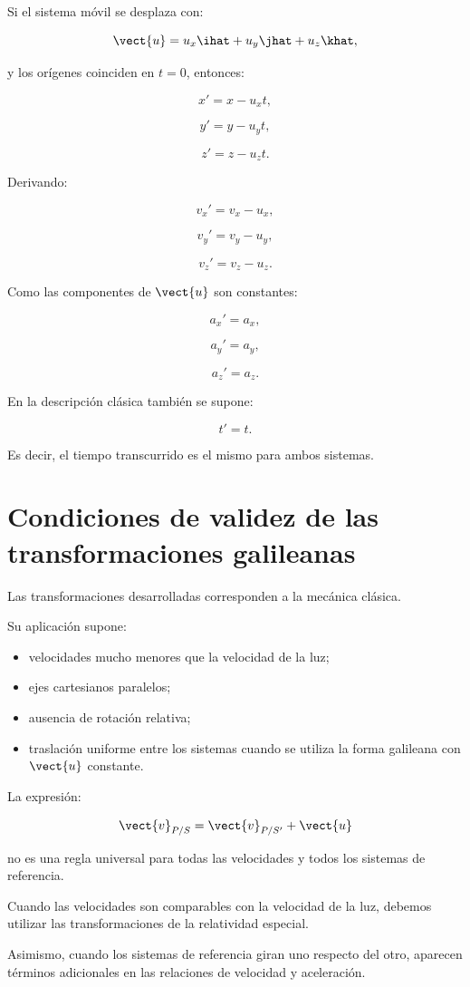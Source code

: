 Si el sistema móvil se desplaza con:

\[
\vect{u}
=
u_x\ihat+u_y\jhat+u_z\khat,
\]

y los orígenes coinciden en \(t=0\),
entonces:

\[
\boxed{
x'=x-u_xt
},
\]

\[
\boxed{
y'=y-u_yt
},
\]

\[
\boxed{
z'=z-u_zt
}.
\]

Derivando:

\[
\boxed{
v_x'=v_x-u_x
},
\]

\[
\boxed{
v_y'=v_y-u_y
},
\]

\[
\boxed{
v_z'=v_z-u_z
}.
\]

Como las componentes de \(\vect{u}\)
son constantes:

\[
\boxed{
a_x'=a_x
},
\]

\[
\boxed{
a_y'=a_y
},
\]

\[
\boxed{
a_z'=a_z
}.
\]

En la descripción clásica también se supone:

\[
\boxed{
t'=t
}.
\]

Es decir, el tiempo transcurrido es el mismo
para ambos sistemas.


\section{Condiciones de validez de las transformaciones galileanas}

Las transformaciones desarrolladas corresponden
a la mecánica clásica.

Su aplicación supone:

\begin{itemize}
    \item velocidades mucho menores que la velocidad
    de la luz;
    \item ejes cartesianos paralelos;
    \item ausencia de rotación relativa;
    \item traslación uniforme entre los sistemas
    cuando se utiliza la forma galileana
    con \(\vect{u}\) constante.
\end{itemize}

\begin{advertencia}

La expresión:

\[
\vect{v}_{P/S}
=
\vect{v}_{P/S'}+\vect{u}
\]

no es una regla universal para todas las velocidades
y todos los sistemas de referencia.

Cuando las velocidades son comparables
con la velocidad de la luz, debemos utilizar
las transformaciones de la relatividad especial.

Asimismo, cuando los sistemas de referencia giran
uno respecto del otro, aparecen términos adicionales
en las relaciones de velocidad y aceleración.

\end{advertencia}


